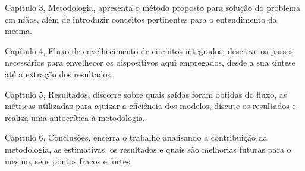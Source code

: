 Capítulo 3, Metodologia, apresenta o método proposto para solução do problema em mãos, além de introduzir conceitos pertinentes para o entendimento da mesma.

Capítulo 4, Fluxo de envelhecimento de circuitos integrados, descreve os passos necessários para envelhecer os dispositivos aqui empregados, desde a sua síntese até a extração dos resultados.

Capítulo 5, Resultados, discorre sobre quais saídas foram obtidas do fluxo, as métricas utilizadas para ajuizar a eficiência dos modelos, discute os resultados e realiza uma autocrítica à metodologia. 

Capítulo 6, Conclusões, encerra o trabalho analisando a contribuição da metodologia, as estimativas, os resultados e quais são melhorias futuras para o mesmo, seus pontos fracos e fortes.